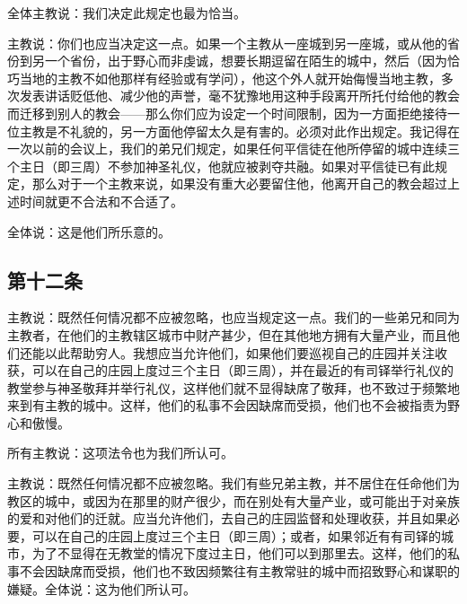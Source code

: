 全体主教说：我们决定此规定也最为恰当。\par

主教说：你们也应当决定这一点。如果一个主教从一座城到另一座城，或从他的省份到另一个省份，出于野心而非虔诚，想要长期逗留在陌生的城中，然后（因为恰巧当地的主教不如他那样有经验或有学问），他这个外人就开始侮慢当地主教，多次发表讲话贬低他、减少他的声誉，毫不犹豫地用这种手段离开所托付给他的教会而迁移到别人的教会——那么你们应为设定一个时间限制，因为一方面拒绝接待一位主教是不礼貌的，另一方面他停留太久是有害的。必须对此作出规定。我记得在一次以前的会议上，我们的弟兄们规定，如果任何平信徒在他所停留的城中连续三个主日（即三周）不参加神圣礼仪，他就应被剥夺共融。如果对平信徒已有此规定，那么对于一个主教来说，如果没有重大必要留住他，他离开自己的教会超过上述时间就更不合法和不合适了。\par

全体说：这是他们所乐意的。\par


\subsection{第十二条}

主教说：既然任何情况都不应被忽略，也应当规定这一点。我们的一些弟兄和同为主教者，在他们的主教辖区城市中财产甚少，但在其他地方拥有大量产业，而且他们还能以此帮助穷人。我想应当允许他们，如果他们要巡视自己的庄园并关注收获，可以在自己的庄园上度过三个主日（即三周），并在最近的有司铎举行礼仪的教堂参与神圣敬拜并举行礼仪，这样他们就不显得缺席了敬拜，也不致过于频繁地来到有主教的城中。这样，他们的私事不会因缺席而受损，他们也不会被指责为野心和傲慢。\par

所有主教说：这项法令也为我们所认可。\par

主教说：既然任何情况都不应被忽略。我们有些兄弟主教，并不居住在任命他们为教区的城中，或因为在那里的财产很少，而在别处有大量产业，或可能出于对亲族的爱和对他们的迁就。应当允许他们，去自己的庄园监督和处理收获，并且如果必要，可以在自己的庄园上度过三个主日（即三周）；或者，如果邻近有有司铎的城市，为了不显得在无教堂的情况下度过主日，他们可以到那里去。这样，他们的私事不会因缺席而受损，他们也不致因频繁往有主教常驻的城中而招致野心和谋职的嫌疑。全体说：这为他们所认可。\par

